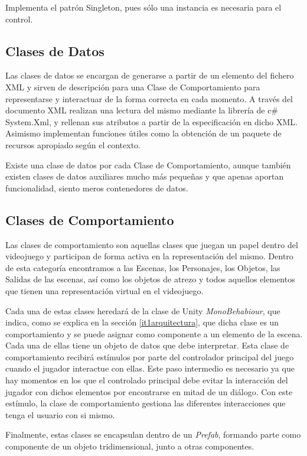 Implementa el patrón Singleton, pues sólo una instancia es necesaria para el control.

\subsection{Clases de Datos}

Las clases de datos se encargan de generarse a partir de un elemento del fichero XML y sirven de descripción para una Clase de Comportamiento para representarse y interactuar de la forma correcta en cada momento. A través del documento XML realizan una lectura del mismo mediante la librería de c\# System.Xml, y rellenan sus atributos a partir de la especificación en dicho XML. Asimismo implementan funciones útiles como la obtención de un paquete de recursos apropiado según el contexto.

Existe una clase de datos por cada Clase de Comportamiento, aunque también existen clases de datos auxiliares mucho más pequeñas y que apenas aportan funcionalidad, siento meros contenedores de datos.

\subsection{Clases de Comportamiento}

Las clases de comportamiento son aquellas clases que juegan un papel dentro del videojuego y participan de forma activa en la representación del mismo. Dentro de esta categoría encontramos a las Escenas, los Personajes, los Objetos, las Salidas de las escenas, así como los objetos de atrezo y todos aquellos elementos que tienen una representación virtual en el videojuego. 

Cada una de estas clases heredará de la clase de Unity \textit{MonoBehabiour}, que indica, como se explica en la sección \ref{it1arquitectura}, que dicha clase es un comportamiento y se puede asignar como componente a un elemento de la escena. Cada una de ellas tiene un objeto de datos que debe interpretar. Esta clase de comportamiento recibirá estímulos por parte del controlador principal del juego cuando el jugador interactue con ellas. Este paso intermedio es necesario ya que hay momentos en los que el controlado principal debe evitar la interacción del jugador con dichos elementos por encontrarse en mitad de un diálogo. Con este estímulo, la clase de comportamiento gestiona las diferentes interacciones que tenga el usuario con si mismo.

Finalmente, estas clases se encapsulan dentro de un \textit{Prefab}, formando parte como componente de un objeto tridimensional, junto a otras componentes.

